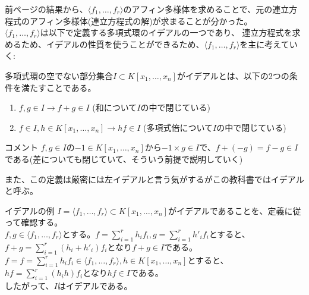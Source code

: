 \begin{frame}
	前ページの結果から、$\langle f_1,\ldots,f_r\rangle$のアフィン多様体を求めることで、元の連立方程式のアフィン多様体(連立方程式の解)が求まることが分かった。\\
	$\langle f_1,\ldots,f_r\rangle$は以下で定義する多項式環のイデアルの一つであり、
	連立方程式を求めるため、イデアルの性質を使うことができるため、$\langle f_1,\ldots,f_r\rangle$を主に考えていく:
	\begin{definition} [イデアル]
		多項式環の空でない部分集合$I \subset K[x_1,\ldots,x_n]$がイデアルとは、以下の2つの条件を満たすことである。
		\begin{enumerate}
			\item $f, g \in I \rightarrow f+g \in I$ (和について$I$の中で閉じている)
			\item $f \in I, h \in K[x_1,\ldots,x_n] \rightarrow hf \in I$ (多項式倍について$I$の中で閉じている)
		\end{enumerate}
	\end{definition}
	\begin{block} {コメント}
		$f, g \in I$の$-1 \in K[x_1,\ldots, x_n]$から$-1 \times g \in I$で、$f+(-g)=f-g \in I$である(差についても閉じていて、そういう前提で説明していく)
	\end{block}
	また、この定義は厳密には左イデアルと言う気がするがこの教科書ではイデアルと呼ぶ。
\end{frame}

\begin{frame} {イデアルの例}
	$I=\langle f_1,\ldots,f_r\rangle \subset K[x_1,\ldots,x_n]$がイデアルであることを、定義に従って確認する。\\
	$f, g \in \langle f_1,\ldots,f_r\rangle$とする。$f = \sum_{i=1}^r h_i f_i, g = \sum_{i=1}^r h'_i f_i$とすると、
	$f+g = \sum_{i=1}^r (h_i+h'_i) f_i$となり$f+g \in I$である。\\
	$f = f = \sum_{i=1}^r h_i f_i \in \langle f_1,\ldots,f_r\rangle, h \in K[x_1,\ldots,x_n]$とすると、
	$hf = \sum_{i=1}^r (h_i h) f_i$となり$hf \in I$である。\\
	したがって、$I$はイデアルである。
\end{frame}

